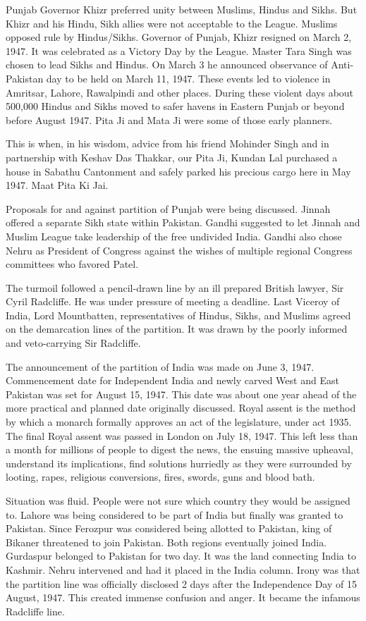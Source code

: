 Punjab Governor Khizr preferred unity between Muslims, Hindus and Sikhs. But Khizr and his Hindu, Sikh allies were not acceptable to the League. Muslims opposed rule by Hindus/Sikhs. Governor of Punjab, Khizr resigned on March 2, 1947. It was celebrated as a Victory Day by the League. Master Tara Singh was chosen to lead Sikhs and Hindus. On March 3 he announced observance of Anti-Pakistan day to be held on March 11, 1947. These events led to violence in Amritsar, Lahore, Rawalpindi and other places. During these violent days about 500,000 Hindus and Sikhs moved to safer havens in Eastern Punjab or beyond before August 1947. Pita Ji and Mata Ji were some of those early planners. 

This is when, in his wisdom, advice from his friend Mohinder Singh and in partnership with Keshav Das Thakkar, our Pita Ji, Kundan Lal purchased a house in Sabathu Cantonment and safely parked his precious cargo here in May 1947. Maat Pita Ki Jai.

Proposals for and against partition of Punjab were being discussed. Jinnah offered a separate Sikh state within Pakistan. Gandhi suggested to let Jinnah and Muslim League take leadership of the free undivided India. Gandhi also chose Nehru as President of Congress against the wishes of multiple regional Congress committees who favored Patel. 

The turmoil followed a pencil-drawn line by an ill prepared British lawyer, Sir Cyril Radcliffe. He was under pressure of meeting a deadline. Last Viceroy of India, Lord Mountbatten, representatives of Hindus, Sikhs, and Muslims agreed on the demarcation lines of the partition. It was drawn by the poorly informed and veto-carrying Sir Radcliffe. 

The announcement of the partition of India was made on June 3, 1947. Commencement date for Independent India and newly carved West and East Pakistan was set for August 15, 1947. This date was about one year ahead of the more practical and planned date originally discussed. 
Royal assent is the method by which a monarch formally approves an act of the legislature, under act 1935. The final Royal assent was passed in London on July 18, 1947. This left less than a month for millions of people to digest the news, the ensuing massive upheaval, understand its implications, find solutions hurriedly as they were surrounded by looting, rapes, religious conversions, fires, swords, guns and blood bath. 

Situation was fluid. People were not sure which country they would be assigned to. Lahore was being considered to be part of India but finally was granted to Pakistan. Since Ferozpur was considered being allotted to Pakistan, king of Bikaner threatened to join Pakistan. Both regions eventually joined India. Gurdaspur belonged to Pakistan for two day. It was the land connecting India to Kashmir. Nehru intervened and had it placed in the India column. Irony was that the partition line was officially disclosed 2 days after the Independence Day of 15 August, 1947. This created immense confusion and anger. It became the infamous Radcliffe line.

